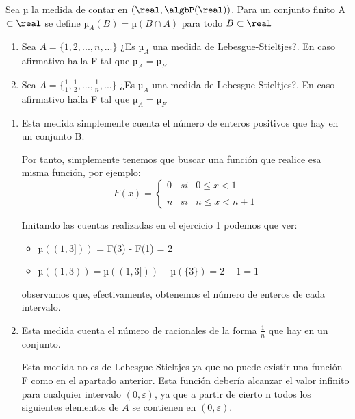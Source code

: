 \begin{problem}
Sea µ la medida de contar en $(\real, \algbP(\real))$. Para un conjunto finito A $\subset \real$ se define $µ_A(B) = µ(B \cap A)$ para todo $B \subset \real$

\begin{enumerate}
\item Sea $A=\{1,2,...,n,...\}$ ¿Es $µ_A$ una medida de Lebesgue-Stieltjes?. En caso afirmativo halla F tal que $µ_A=µ_F$
\item Sea $A=\{\frac{1}{1},\frac{1}{2},...,\frac{1}{n},...\}$ ¿Es $µ_A$ una medida de Lebesgue-Stieltjes?. En caso afirmativo halla F tal que $µ_A=µ_F$
\end{enumerate}

\solution

\begin{enumerate}
\item Esta medida simplemente cuenta el número de enteros positivos que hay en un conjunto B.

Por tanto, simplemente tenemos que buscar una función que realice esa misma función, por ejemplo:
\[F(x)=\left\{ \begin{array}{lcc}
             0 &   si  & 0 \leq x < 1 \\
             \\ n &  si  & n \leq x < n+1
             \end{array}
   \right.\]

Imitando las cuentas realizadas en el ejercicio 1 podemos que ver:
\begin{itemize}
\item $µ((1,3]))$ = F(3) - F(1) = 2
\item $µ((1,3)) = µ((1,3])) - µ(\{3\}) = 2 - 1 = 1$
\end{itemize}
observamos que, efectivamente, obtenemos el número de enteros de cada intervalo.

\item Esta medida cuenta el número de racionales de la forma $\frac{1}{n}$ que hay en un conjunto.

Esta medida no es de Lebesgue-Stieltjes ya que no puede existir una función F como en el apartado anterior. Esta función debería alcanzar el valor infinito para cualquier intervalo $(0, ε)$, ya que a partir de cierto n todos los siguientes elementos de $A$ se contienen en $(0, ε)$.

\end{enumerate}
\end{problem}

